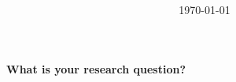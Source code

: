 \documentclass[11pt]{article}
\title{%
}
\date{\today}
\begin{document}
\maketitle
{\bfseries\large What is your research question?}\\
\end{document}
